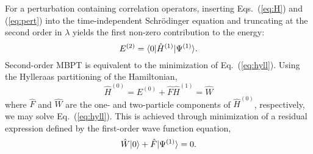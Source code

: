 For a perturbation containing correlation operators, inserting
Eqs.~(\ref{eq:H}) and (\ref{eq:pert}) into the time-independent Schr\"odinger
equation and truncating at the second order in $\lambda$ yields the first
non-zero contribution to the energy:\cite{Szabo1996} \begin{equation}
\label{eq:hyll}
    E^{(2)} = \langle0 |\hat{H}^{(1)}| \Psi^{(1)} \rangle.
\end{equation} Second-order MBPT is equivalent to the minimization
of Eq.~(\ref{eq:hyll}). Using the Hylleraas partitioning of the
Hamiltonian,\cite{Pulay1986b} \begin{subequations}
    \begin{equation}
        \hat{H}^{(0)} = E^{(0)} + \hat{F}
    \end{equation} \begin{equation}
        \hat{H}^{(1)} = \hat{W}
    \end{equation}
\end{subequations} where $\hat{F}$ and $\hat{W}$ are the one- and
two-particle components of $\hat{H}^{(0)}$, respectively, we may solve Eq.~(\ref{eq:hyll}).
This is achieved
through minimization of a residual expression defined by the first-order
wave function equation, 
\begin{equation} \label{eq:mp2_res}
    \hat{W}| 0 \rangle + \hat{F}| \Psi^{(1)} \rangle = 0.
\end{equation} 

